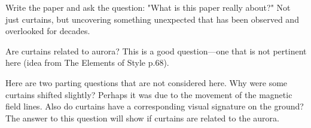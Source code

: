 \documentclass[draft]{agujournal2019}
\begin{document}
Write the paper and ask the question: "What is this paper really about?" Not just curtains, but uncovering something unexpected that has been observed and overlooked for decades.

Are curtains related to aurora? This is a good question---one that is not pertinent here (idea from The Elements of Style p.68).

Here are two parting questions that are not considered here. Why were some curtains shifted slightly? Perhaps it was due to the movement of the magnetic field lines. Also do curtains have a corresponding visual signature on the ground? The answer to this question will show if curtains are related to the aurora.


%
\end{document}
